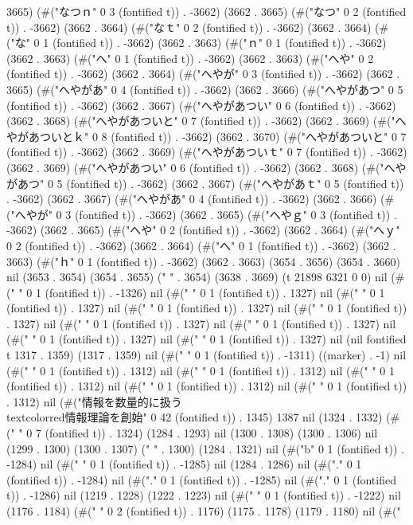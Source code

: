 3665) (#("なつｎ" 0 3 (fontified t)) . -3662) (3662 . 3665) (#("なつ" 0 2 (fontified t)) . -3662) (3662 . 3664) (#("なｔ" 0 2 (fontified t)) . -3662) (3662 . 3664) (#("な" 0 1 (fontified t)) . -3662) (3662 . 3663) (#("ｎ" 0 1 (fontified t)) . -3662) (3662 . 3663) (#("へ" 0 1 (fontified t)) . -3662) (3662 . 3663) (#("へや" 0 2 (fontified t)) . -3662) (3662 . 3664) (#("へやが" 0 3 (fontified t)) . -3662) (3662 . 3665) (#("へやがあ" 0 4 (fontified t)) . -3662) (3662 . 3666) (#("へやがあつ" 0 5 (fontified t)) . -3662) (3662 . 3667) (#("へやがあつい" 0 6 (fontified t)) . -3662) (3662 . 3668) (#("へやがあついと" 0 7 (fontified t)) . -3662) (3662 . 3669) (#("へやがあついとｋ" 0 8 (fontified t)) . -3662) (3662 . 3670) (#("へやがあついと" 0 7 (fontified t)) . -3662) (3662 . 3669) (#("へやがあついｔ" 0 7 (fontified t)) . -3662) (3662 . 3669) (#("へやがあつい" 0 6 (fontified t)) . -3662) (3662 . 3668) (#("へやがあつ" 0 5 (fontified t)) . -3662) (3662 . 3667) (#("へやがあｔ" 0 5 (fontified t)) . -3662) (3662 . 3667) (#("へやがあ" 0 4 (fontified t)) . -3662) (3662 . 3666) (#("へやが" 0 3 (fontified t)) . -3662) (3662 . 3665) (#("へやｇ" 0 3 (fontified t)) . -3662) (3662 . 3665) (#("へや" 0 2 (fontified t)) . -3662) (3662 . 3664) (#("へｙ" 0 2 (fontified t)) . -3662) (3662 . 3664) (#("へ" 0 1 (fontified t)) . -3662) (3662 . 3663) (#("ｈ" 0 1 (fontified t)) . -3662) (3662 . 3663) (3654 . 3656) (3654 . 3660) nil (3653 . 3654) (3654 . 3655) ("  " . 3654) (3638 . 3669) (t 21898 6321 0 0) nil (#("
" 0 1 (fontified t)) . -1326) nil (#(" " 0 1 (fontified t)) . 1327) nil (#(" " 0 1 (fontified t)) . 1327) nil (#(" " 0 1 (fontified t)) . 1327) nil (#(" " 0 1 (fontified t)) . 1327) nil (#(" " 0 1 (fontified t)) . 1327) nil (#(" " 0 1 (fontified t)) . 1327) nil (#(" " 0 1 (fontified t)) . 1327) nil (#("	" 0 1 (fontified t)) . 1327) nil (nil fontified t 1317 . 1359) (1317 . 1359) nil (#("	" 0 1 (fontified t)) . -1311) ((marker) . -1) nil (#(" " 0 1 (fontified t)) . 1312) nil (#(" " 0 1 (fontified t)) . 1312) nil (#("	" 0 1 (fontified t)) . 1312) nil (#("	" 0 1 (fontified t)) . 1312) nil (#("	" 0 1 (fontified t)) . 1312) nil (#("情報を数量的に扱う
	       \\textcolor{red}{情報理論}を創始" 0 42 (fontified t)) . 1345) 1387 nil (1324 . 1332) (#("						 " 0 7 (fontified t)) . 1324) (1284 . 1293) nil (1300 . 1308) (1300 . 1306) nil (1299 . 1300) (1300 . 1307) ("						  " . 1300) (1284 . 1321) nil (#("b" 0 1 (fontified t)) . -1284) nil (#(" " 0 1 (fontified t)) . -1285) nil (1284 . 1286) nil (#("." 0 1 (fontified t)) . -1284) nil (#("." 0 1 (fontified t)) . -1285) nil (#("." 0 1 (fontified t)) . -1286) nil (1219 . 1228) (1222 . 1223) nil (#(" " 0 1 (fontified t)) . -1222) nil (1176 . 1184) (#("		" 0 2 (fontified t)) . 1176) (1175 . 1178) (1179 . 1180) nil (#("
